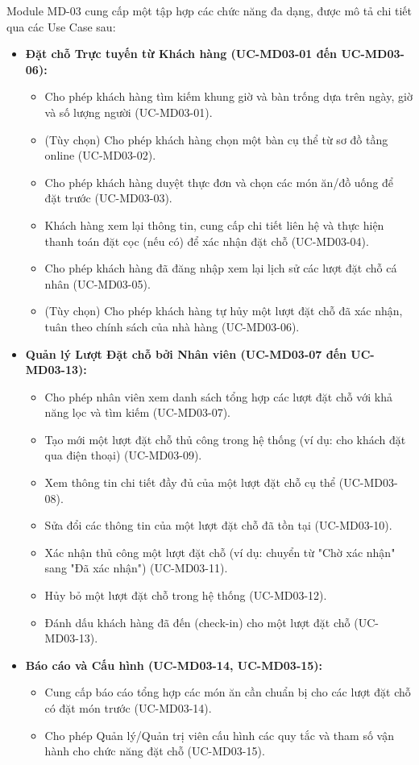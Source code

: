 \label{sssec:md03_key_functionalities}
Module MD-03 cung cấp một tập hợp các chức năng đa dạng, được mô tả chi tiết qua các Use Case sau:

\begin{itemize}
    \item \textbf{Đặt chỗ Trực tuyến từ Khách hàng (UC-MD03-01 đến UC-MD03-06):}
    \begin{itemize}
        \item Cho phép khách hàng tìm kiếm khung giờ và bàn trống dựa trên ngày, giờ và số lượng người (UC-MD03-01).
        \item (Tùy chọn) Cho phép khách hàng chọn một bàn cụ thể từ sơ đồ tầng online (UC-MD03-02).
        \item Cho phép khách hàng duyệt thực đơn và chọn các món ăn/đồ uống để đặt trước (UC-MD03-03).
        \item Khách hàng xem lại thông tin, cung cấp chi tiết liên hệ và thực hiện thanh toán đặt cọc (nếu có) để xác nhận đặt chỗ (UC-MD03-04).
        \item Cho phép khách hàng đã đăng nhập xem lại lịch sử các lượt đặt chỗ cá nhân (UC-MD03-05).
        \item (Tùy chọn) Cho phép khách hàng tự hủy một lượt đặt chỗ đã xác nhận, tuân theo chính sách của nhà hàng (UC-MD03-06).
    \end{itemize}

    \item \textbf{Quản lý Lượt Đặt chỗ bởi Nhân viên (UC-MD03-07 đến UC-MD03-13):}
    \begin{itemize}
        \item Cho phép nhân viên xem danh sách tổng hợp các lượt đặt chỗ với khả năng lọc và tìm kiếm (UC-MD03-07).
        \item Tạo mới một lượt đặt chỗ thủ công trong hệ thống (ví dụ: cho khách đặt qua điện thoại) (UC-MD03-09).
        \item Xem thông tin chi tiết đầy đủ của một lượt đặt chỗ cụ thể (UC-MD03-08).
        \item Sửa đổi các thông tin của một lượt đặt chỗ đã tồn tại (UC-MD03-10).
        \item Xác nhận thủ công một lượt đặt chỗ (ví dụ: chuyển từ "Chờ xác nhận" sang "Đã xác nhận") (UC-MD03-11).
        \item Hủy bỏ một lượt đặt chỗ trong hệ thống (UC-MD03-12).
        \item Đánh dấu khách hàng đã đến (check-in) cho một lượt đặt chỗ (UC-MD03-13).
    \end{itemize}

    \item \textbf{Báo cáo và Cấu hình (UC-MD03-14, UC-MD03-15):}
    \begin{itemize}
        \item Cung cấp báo cáo tổng hợp các món ăn cần chuẩn bị cho các lượt đặt chỗ có đặt món trước (UC-MD03-14).
        \item Cho phép Quản lý/Quản trị viên cấu hình các quy tắc và tham số vận hành cho chức năng đặt chỗ (UC-MD03-15).
    \end{itemize}
\end{itemize}

